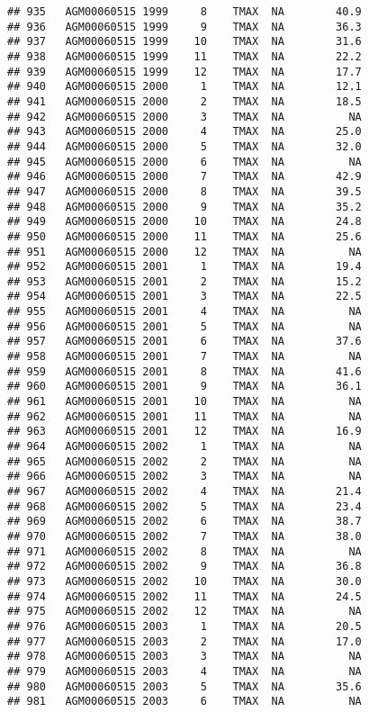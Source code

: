 \documentclass{article}\usepackage[]{graphicx}\usepackage[]{color}
\makeatletter
\newenvironment{kframe}{%
 \def\at@end@of@kframe{}%
 \ifinner\ifhmode%
  \def\at@end@of@kframe{\end{minipage}}%
  \begin{minipage}{\columnwidth}%
 \fi\fi%
 \def\FrameCommand##1{\hskip\@totalleftmargin \hskip-\fboxsep
 \colorbox{shadecolor}{##1}\hskip-\fboxsep
     \hskip-\linewidth \hskip-\@totalleftmargin \hskip\columnwidth}%
 \MakeFramed {\advance\hsize-\width
   \@totalleftmargin\z@ \linewidth\hsize
   \@setminipage}}%
 {\par\unskip\endMakeFramed%
 \at@end@of@kframe}
\newenvironment{knitrout}{}{} %
\makeatother
\begin{document}
\begin{knitrout}
\begin{kframe}
\begin{verbatim}
## 935   AGM00060515 1999     8    TMAX  NA        40.9
## 936   AGM00060515 1999     9    TMAX  NA        36.3
## 937   AGM00060515 1999    10    TMAX  NA        31.6
## 938   AGM00060515 1999    11    TMAX  NA        22.2
## 939   AGM00060515 1999    12    TMAX  NA        17.7
## 940   AGM00060515 2000     1    TMAX  NA        12.1
## 941   AGM00060515 2000     2    TMAX  NA        18.5
## 942   AGM00060515 2000     3    TMAX  NA          NA
## 943   AGM00060515 2000     4    TMAX  NA        25.0
## 944   AGM00060515 2000     5    TMAX  NA        32.0
## 945   AGM00060515 2000     6    TMAX  NA          NA
## 946   AGM00060515 2000     7    TMAX  NA        42.9
## 947   AGM00060515 2000     8    TMAX  NA        39.5
## 948   AGM00060515 2000     9    TMAX  NA        35.2
## 949   AGM00060515 2000    10    TMAX  NA        24.8
## 950   AGM00060515 2000    11    TMAX  NA        25.6
## 951   AGM00060515 2000    12    TMAX  NA          NA
## 952   AGM00060515 2001     1    TMAX  NA        19.4
## 953   AGM00060515 2001     2    TMAX  NA        15.2
## 954   AGM00060515 2001     3    TMAX  NA        22.5
## 955   AGM00060515 2001     4    TMAX  NA          NA
## 956   AGM00060515 2001     5    TMAX  NA          NA
## 957   AGM00060515 2001     6    TMAX  NA        37.6
## 958   AGM00060515 2001     7    TMAX  NA          NA
## 959   AGM00060515 2001     8    TMAX  NA        41.6
## 960   AGM00060515 2001     9    TMAX  NA        36.1
## 961   AGM00060515 2001    10    TMAX  NA          NA
## 962   AGM00060515 2001    11    TMAX  NA          NA
## 963   AGM00060515 2001    12    TMAX  NA        16.9
## 964   AGM00060515 2002     1    TMAX  NA          NA
## 965   AGM00060515 2002     2    TMAX  NA          NA
## 966   AGM00060515 2002     3    TMAX  NA          NA
## 967   AGM00060515 2002     4    TMAX  NA        21.4
## 968   AGM00060515 2002     5    TMAX  NA        23.4
## 969   AGM00060515 2002     6    TMAX  NA        38.7
## 970   AGM00060515 2002     7    TMAX  NA        38.0
## 971   AGM00060515 2002     8    TMAX  NA          NA
## 972   AGM00060515 2002     9    TMAX  NA        36.8
## 973   AGM00060515 2002    10    TMAX  NA        30.0
## 974   AGM00060515 2002    11    TMAX  NA        24.5
## 975   AGM00060515 2002    12    TMAX  NA          NA
## 976   AGM00060515 2003     1    TMAX  NA        20.5
## 977   AGM00060515 2003     2    TMAX  NA        17.0
## 978   AGM00060515 2003     3    TMAX  NA          NA
## 979   AGM00060515 2003     4    TMAX  NA          NA
## 980   AGM00060515 2003     5    TMAX  NA        35.6
## 981   AGM00060515 2003     6    TMAX  NA          NA

\end{verbatim}
\end{kframe}
\end{knitrout}
\end{document}
